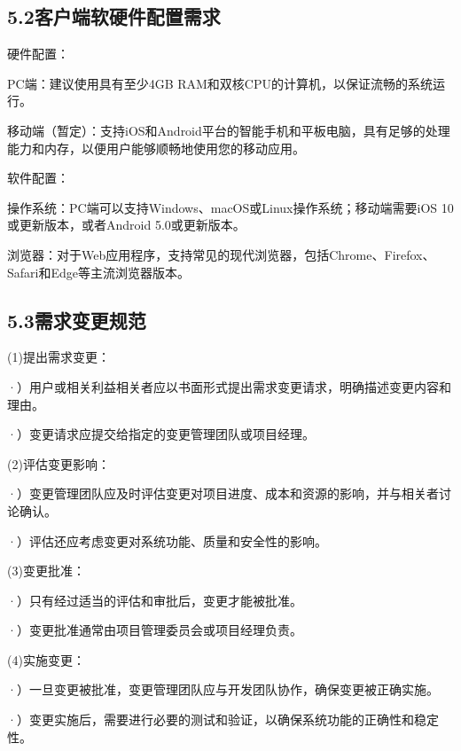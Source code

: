 \documentclass[24pt,a4paper]{article}%
\begin{document}
\subsection*{\songti 5.2客户端软硬件配置需求}
\noindent 硬件配置：\par
PC端：建议使用具有至少4GB RAM和双核CPU的计算机，以保证流畅的系统运行。\par
移动端（暂定）：支持iOS和Android平台的智能手机和平板电脑，具有足够的处理能力和内存，以便用户能够顺畅地使用您的移动应用。\par
\noindent 软件配置：\par
操作系统：PC端可以支持Windows、macOS或Linux操作系统；移动端需要iOS 10或更新版本，或者Android 5.0或更新版本。\par
浏览器：对于Web应用程序，支持常见的现代浏览器，包括Chrome、Firefox、Safari和Edge等主流浏览器版本。
\newpage
\subsection*{\songti 5.3需求变更规范}
\noindent (1)提出需求变更：\par
·）用户或相关利益相关者应以书面形式提出需求变更请求，明确描述变更内容和理由。\par
·）变更请求应提交给指定的变更管理团队或项目经理。\par
\noindent (2)评估变更影响：\par
·）变更管理团队应及时评估变更对项目进度、成本和资源的影响，并与相关者讨论确认。\par
·）评估还应考虑变更对系统功能、质量和安全性的影响。\par
\noindent (3)变更批准：\par
·）只有经过适当的评估和审批后，变更才能被批准。\par
·）变更批准通常由项目管理委员会或项目经理负责。\par
\noindent (4)实施变更：\par
·）一旦变更被批准，变更管理团队应与开发团队协作，确保变更被正确实施。\par
·）变更实施后，需要进行必要的测试和验证，以确保系统功能的正确性和稳定性。\par
\end{document}

